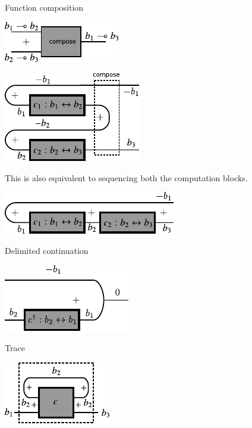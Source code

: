\documentclass[preprint]{sigplanconf}
\begin{document}
Function composition

\begin{center}
  \includegraphics{diagrams/compose1.pdf}
\end{center}

\begin{center}
  \includegraphics{diagrams/compose.pdf}
\end{center}

This is also equivalent to sequencing both the computation blocks. 

\begin{center}
  \includegraphics{diagrams/compose2.pdf}
\end{center}


Delimited continuation

\begin{center}
  \includegraphics{diagrams/delimc.pdf}
\end{center}

Trace 


\begin{center}
  \includegraphics{diagrams/trace.pdf}
\end{center}
\end{document}
